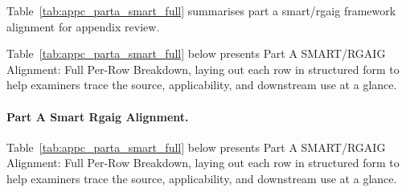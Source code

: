 \noindent Table~\ref{tab:appc_parta_smart_full} summarises part a smart/rgaig framework alignment for appendix review.

\clearpage
{\tablestripes\tablefontsize

\noindent Table~\ref{tab:appc_parta_smart_full} below presents Part A SMART/RGAIG Alignment: Full Per-Row Breakdown, laying out each row in structured form to help examiners trace the source, applicability, and downstream use at a glance. %
\paragraph{Part A Smart Rgaig Alignment.} %
\noindent Table~\ref{tab:appc_parta_smart_full} below presents Part A SMART/RGAIG Alignment: Full Per-Row Breakdown, laying out each row in structured form to help examiners trace the source, applicability, and downstream use at a glance. %



}
